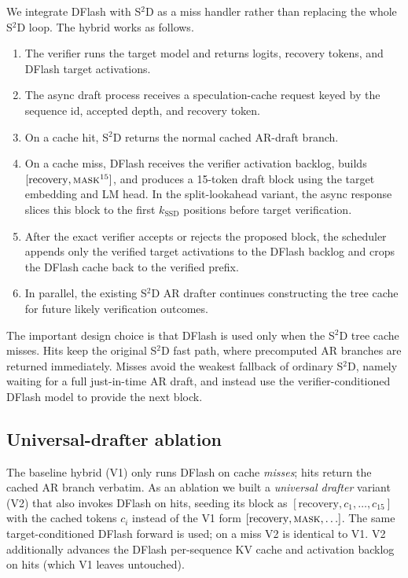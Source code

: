 We integrate DFlash with S$^2$D as a miss handler rather than replacing the
whole S$^2$D loop. The hybrid works as follows.

\begin{enumerate}
  \item The verifier runs the target model and returns logits, recovery
        tokens, and DFlash target activations.
  \item The async draft process receives a speculation-cache request keyed by
        the sequence id, accepted depth, and recovery token.
  \item On a cache hit, S$^2$D returns the normal cached AR-draft branch.
  \item On a cache miss, DFlash receives the verifier activation backlog,
        builds $[\text{recovery}, \textsc{mask}^{15}]$, and produces a
        15-token draft block using the target embedding and LM head. In the
        split-lookahead variant, the async response slices this block to the
        first $k_{\mathrm{SSD}}$ positions before target verification.
  \item After the exact verifier accepts or rejects the proposed block, the
        scheduler appends only the verified target activations to the DFlash
        backlog and crops the DFlash cache back to the verified prefix.
  \item In parallel, the existing S$^2$D AR drafter continues constructing the
        tree cache for future likely verification outcomes.
\end{enumerate}

The important design choice is that DFlash is used only when the S$^2$D tree
cache misses. Hits keep the original S$^2$D fast path, where precomputed AR
branches are returned immediately. Misses avoid the weakest fallback of
ordinary S$^2$D, namely waiting for a full just-in-time AR draft, and instead
use the verifier-conditioned DFlash model to provide the next block.

\subsection{Universal-drafter ablation}
\label{sec:universal-drafter}

The baseline hybrid (V1) only runs DFlash on cache \emph{misses}; hits
return the cached AR branch verbatim. As an ablation we built a
\emph{universal drafter} variant (V2) that also invokes DFlash on hits,
seeding its block as $[\text{recovery}, c_1, \ldots, c_{15}]$ with the
cached tokens $c_i$ instead of the V1 form
$[\text{recovery}, \textsc{mask}, \ldots]$. The same target-conditioned
DFlash forward is used; on a miss V2 is identical to V1. V2 additionally
advances the DFlash per-sequence KV cache and activation backlog on hits
(which V1 leaves untouched).

